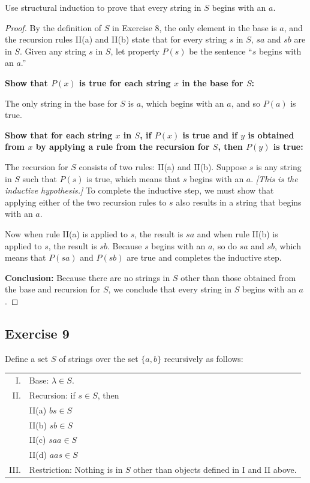 \documentclass[14pt]{extarticle}
\begin{document}
Use structural induction to prove that every string in $S$ begins with an $a$.

\begin{proof}
By the definition of $S$ in Exercise 8, the only element in the base is $a$, and the recursion rules II(a) and II(b) 
state that for every string $s$ in $S$, $sa$ and $sb$ are in $S$. Given any string $s$ in $S$, let property $P(s)$ be 
the sentence “$s$ begins with an $a$.” 

{\bf Show that $P(x)$ is true for each string $x$ in the base for $S$:}

The only string in the base for $S$ is $a$, which begins with an $a$, and so $P(a)$ is true. 

{\bf Show that for each string $x$ in $S$, if $P(x)$ is true and if $y$ is obtained from $x$ by applying a rule 
from the recursion for $S$, then $P(y)$ is true:}

The recursion for $S$ consists of two rules: II(a) and II(b). Suppose $s$ is any string in $S$ such that $P(s)$ is 
true, which means that $s$ begins with an $a$. {\it [This is the inductive hypothesis.]} To complete the inductive 
step, we must show that applying either of the two recursion rules to $s$ also results in a string that begins with an $a$. 

Now when rule II(a) is applied to $s$, the result is $sa$ and when rule II(b) is applied to $s$, the result is $sb$. 
Because $s$ begins with an $a$, so do $sa$ and $sb$, which means that $P(sa)$ and $P(sb)$ are true and completes the 
inductive step. 

{\bf Conclusion:} Because there are no strings in $S$ other than those obtained from the base and recursion for 
$S$, we conclude that every string in $S$ begins with an $a$.
\end{proof}

\subsection{Exercise 9}
Define a set $S$ of strings over the set \(\{a, b\}\) recursively as follows:

\begin{tabular}{rl}
I. & Base: $\lambda \in S$. \\
II. & Recursion: if $s \in S$, then \\
    & II(a) $bs \in S$ \\
    & II(b) $sb \in S$ \\
    & II(c) $saa \in S$ \\
    & II(d) $aas \in S$ \\
III. & Restriction: Nothing is in $S$ other than objects defined in I and II above.
\end{tabular}
\end{document}
